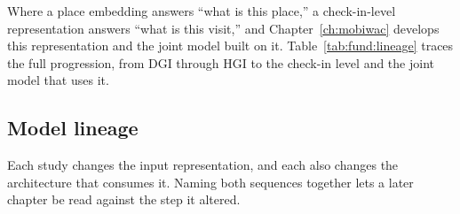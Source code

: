 Where a place embedding answers ``what is this place,'' a check-in-level representation
answers ``what is this visit,'' and
Chapter~\ref{ch:mobiwac} develops this representation and the joint model built on it.
Table~\ref{tab:fund:lineage} traces the full progression, from DGI through HGI to the
check-in level and the joint model that uses it.

\subsection{Model lineage}


Each study changes the input representation, and each also changes the architecture
that consumes it. Naming both sequences together lets a later chapter be read against
the step it altered.

